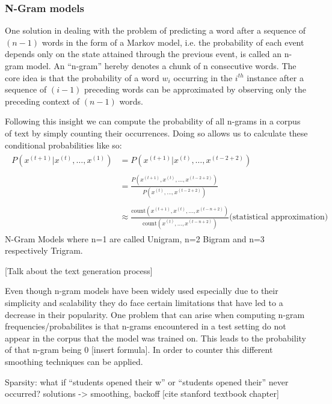 \subsubsection{N-Gram models}
\label{sub:n_gram_models}

One solution in dealing with the problem of predicting a word after a sequence of $ (n - 1) $
words in the form of a Markov model, i.e. the probability of each event depends only on the state
attained through the previous event, is called an n-gram model. An “n-gram” hereby denotes a chunk 
of n consecutive words. The core idea is that the probability of a word $ w_i $ occurring in the 
$ i^{th} $ instance after a sequence of $ (i - 1) $ preceding words can be approximated by observing 
only the preceding context of $ (n - 1) $ words.

Following this insight we can compute the probability of all n-grams in a corpus of text by simply counting their occurrences.
Doing so allows us to calculate these conditional probabilities like so:
\begin{align}
    \begin{split}
        P(x^{(t+1)} | x^{(t)}, \dots, x^{(1)}) &= P(x^{(t+1)} | x^{(t)}, \dots, x^{(t - 2 + 2)}) \\ \\
        &= \frac{P(x^{(t+1)}, x^{(t)}, \dots, x^{(t - 2 + 2)})}{P(x^{(t)}, \dots, x^{(t - 2 + 2)})} \\ \\
        &\approx \frac{\text{count}(x^{(t+1)}, x^{(t)}, \dots, x^{(t - n + 2)})}{\text{count}(x^{(t)}, \dots, x^{(t - n + 2)})} \text{(statistical approximation)}
    \end{split}
\end{align}
N-Gram Models where n=1 are called Unigram, n=2 Bigram and n=3 respectively Trigram.

[Talk about the text generation process]

Even though n-gram models have been widely used especially due to their simplicity and scalability 
they do face certain limitations that have led to a decrease in their popularity. One problem that 
can arise when computing n-gram frequencies/probabilites is that n-grams encountered in a test setting 
do not appear in the corpus that the model was trained on. This leads to the probability of that n-gram being 0 
[insert formula]. In order to counter this different smoothing techniques can be applied. 

Sparsity: what if “students opened their w” or “students opened their'' never occurred? solutions -> smoothing, backoff [cite stanford textbook chapter]

